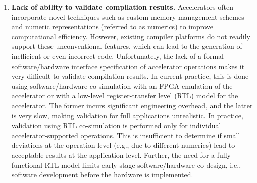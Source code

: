 \begin{enumerate}[label=\textbf{G\arabic{*}}, leftmargin=*]
  \item \textbf{Lack of ability to validate compilation results.} 
  \label{gap.correctness}
  Accelerators often incorporate novel techniques such as custom memory management schemes and numeric representations (referred to as numerics) to improve computational efficiency.
  However, existing compiler platforms do not readily support these unconventional features, %
  which can lead to the generation of inefficient or even incorrect code.
  Unfortunately, the lack of a formal software/hardware interface specification of accelerator operations makes it very difficult to validate compilation results.
  In current practice, this is done using software/hardware co-simulation with an FPGA emulation of the accelerator or with a low-level register-transfer level (RTL) model for the accelerator. The former incurs significant engineering overhead, and the latter is very slow, making validation for full applications unrealistic. In practice, validation using RTL co-simulation is performed only for individual accelerator-supported operations.
  This is insufficient to determine if small deviations at the operation level (e.g., due to different numerics) lead to acceptable results at the application level.
  Further, the need for a fully functional RTL model limits early stage software/hardware co-design, i.e., software development before the hardware is implemented.



\end{enumerate}

